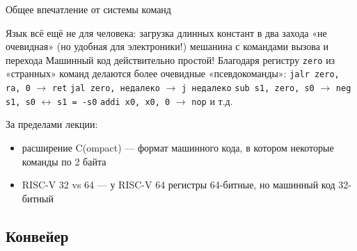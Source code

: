 \documentclass[xetex,aspectratio=43]{beamer}
\begin{document}
\begin{frame}{Общее впечатление от системы команд}
    \begin{outline}[itemize]
        \1 Язык всё ещё не для человека:
            \2 загрузка длинных констант в два захода
            \2 «не очевидная» (но удобная для электроники!) мешанина с командами вызова и перехода
        \1 Машинный код действительно простой!
        \1 Благодаря регистру \texttt{zero} из «странных» команд делаются более очевидные «псевдокоманды»:
            \2 \texttt{jalr zero, ra, 0} $\rightarrow$ \texttt{ret}
            \2 \texttt{jal zero, недалеко} $\rightarrow$ \texttt{j недалеко}
            \2 \texttt{sub s1, zero, s0} $\rightarrow$ \texttt{neg s1, s0} $\leftrightarrow$ \texttt{s1 = -s0}
            \2 \texttt{addi x0, x0, 0} $\rightarrow$ \texttt{nop}
            \2 и т.д.
    \end{outline}
    \pause
    \alert{За пределами лекции:}
    \begin{itemize}
        \item расширение C(ompact) --- формат машинного кода, в котором некоторые команды по 2 байта
        \item RISC-V 32 vs 64 --- у RISC-V 64 регистры 64-битные, но машинный код 32-битный
    \end{itemize}

\end{frame}

\subsection{Конвейер}
\end{document}
